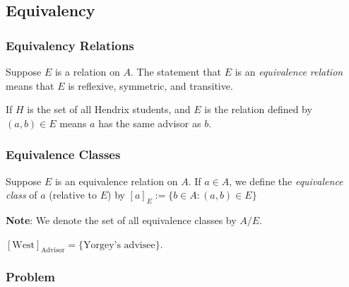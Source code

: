 \subsection{Equivalency}

    \vspace{0.5cm}

        \subsubsection{Equivalency Relations}
    
            \begin{definition}
                Suppose $E$ is a relation on $A$. The statement that $E$ is an \textit{equivalence relation} means that $E$ is reflexive, symmetric, and transitive. 
            \end{definition}
        
            \begin{example}
                If $H$ is the set of all Hendrix students, and $E$ is the relation defined by $(a,b)\in E$ means $a$ has the same advisor as $b$.
            \end{example}
    
        \subsubsection{Equivalence Classes}
    
            \begin{definition}
                Suppose $E$ is an equivalence relation on $A$. If $a\in A$, we define the \textit{equivalence class} of $a$ (relative to $E$) by $[a]_E := \{b\in A\colon (a,b) \in E\}$
            \end{definition}
            \textbf{Note}: We denote the set of all equivalence classes by $A/E$.
        
            \begin{example}
                $[\text{West}]_\text{Advisor} = \{\text{Yorgey's advisee}\}$. 
            \end{example}
    
        \subsubsection{Problem}


